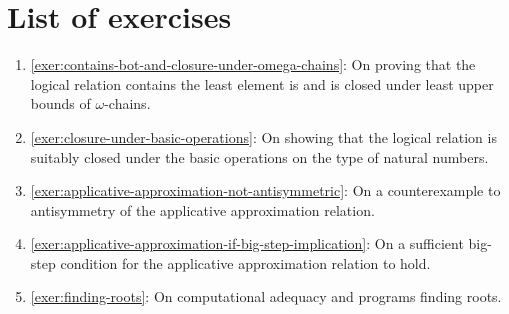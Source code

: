 \section{List of exercises}
\begin{enumerate}
\item \cref{exer:contains-bot-and-closure-under-omega-chains}: On proving that
  the logical relation contains the least element is and is closed under least
  upper bounds of \(\omega\)-chains.
\item \cref{exer:closure-under-basic-operations}: On showing that the logical
  relation is suitably closed under the basic operations on the type of natural
  numbers.
\item \cref{exer:applicative-approximation-not-antisymmetric}: On a
  counterexample to antisymmetry of the applicative approximation relation.
\item \cref{exer:applicative-approximation-if-big-step-implication}: On a
  sufficient big-step condition for the applicative approximation relation to
  hold.
\item \cref{exer:finding-roots}: On computational adequacy and programs finding roots.
\end{enumerate}

